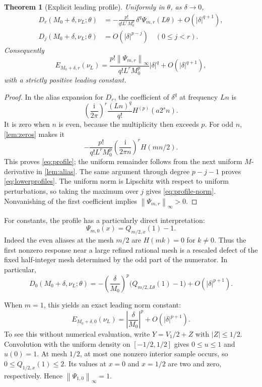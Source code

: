 \documentclass[11pt,a4paper]{article}
\numberwithin{equation}{section}
\theoremstyle{plain}
\newtheorem{theorem}{Theorem}[section]
\theoremstyle{definition}
\theoremstyle{remark}
\newcommand{\ii}{\mathrm i}\newcommand{\dd}{\,\mathrm d}
\newcommand{\norm}[1]{\left\lVert#1\right\rVert}
\begin{document}
\begin{theorem}[Explicit leading profile]\label{thm:profile}
Uniformly in $\theta$, as $\delta\to0$,
\begin{align}
 D_r(M_0+\delta,\nu_L;\theta)
 &=-\frac{p!}{q!L^rM_0^p}\,
 \delta^q\Psi_{m,r}(L\theta)+O(|\delta|^{q+1}),
 \label{eq:profile}\\
 D_j(M_0+\delta,\nu_L;\theta)&=O(|\delta|^{p-j})\quad(0\le j<r).
 \label{eq:lowerprofiles}
\end{align}
Consequently
\begin{equation}\label{eq:profile-norm}
 E_{M_0+\delta,r}(\nu_L)=
 \frac{p!\norm{\Psi_{m,r}}_\infty}{q!L^rM_0^p}|\delta|^q
 +O(|\delta|^{q+1}),
\end{equation}
with a strictly positive leading constant.
\end{theorem}
\begin{proof}
In the alias expansion for $D_r$, the coefficient of $\delta^q$ at frequency
$Ln$ is
\[
 \left(\frac{\ii}{2\pi}\right)^r\frac{(Ln)^q}{q!}
 H^{(p)}(a2^s n).
\]
It is zero when $n$ is even, because the multiplicity then exceeds $p$.
For odd $n$, \cref{lem:zeros} makes it
\[
 -\frac{p!}{q!L^rM_0^p}
 \left(\frac{\ii}{2\pi n}\right)^r H(mn/2).
\]
This proves \eqref{eq:profile}; the uniform remainder follows from the next
uniform $M$-derivative in \cref{lem:alias}. The same argument through degree
$p-j-1$ proves \eqref{eq:lowerprofiles}. The uniform norm is Lipschitz with
respect to uniform perturbations, so taking the maximum over $j$ gives
\eqref{eq:profile-norm}. Nonvanishing of the first coefficient implies
$\norm{\Psi_{m,r}}_\infty>0$.
\end{proof}

For constants, the profile has a particularly direct interpretation:
\begin{equation}\label{eq:coarseprofile}
 \Psi_{m,0}(x)=Q_{m/2,x}(1)-1.
\end{equation}
Indeed the even aliases at the mesh $m/2$ are $H(mk)=0$ for $k\ne0$.
Thus the first nonzero response near a large refined rational mesh is a
rescaled defect of the fixed half-integer mesh determined by the odd part
of the numerator. In particular,
\begin{equation}\label{eq:coarsemass}
 D_0(M_0+\delta,\nu_L;\theta)
 =-\left(\frac\delta{M_0}\right)^p
 \bigl(Q_{m/2,L\theta}(1)-1\bigr)+O(|\delta|^{p+1}).
\end{equation}

When $m=1$, this yields an exact leading norm constant:
\begin{equation}\label{eq:dyadicconstant}
 E_{M_0+\delta,0}(\nu_L)
 =\left|\frac\delta{M_0}\right|^p+O(|\delta|^{p+1}).
\end{equation}
To see this without numerical evaluation, write $Y=V_1/2+Z$ with
$|Z|\le1/2$. Convolution with the uniform density on $[-1/2,1/2]$ gives
$0\le u\le1$ and $u(0)=1$. At mesh $1/2$, at most one nonzero interior
sample occurs, so $0\le Q_{1/2,x}(1)\le2$. Its values at $x=0$ and $x=1/2$
are two and zero, respectively. Hence $\norm{\Psi_{1,0}}_\infty=1$.
\end{document}
